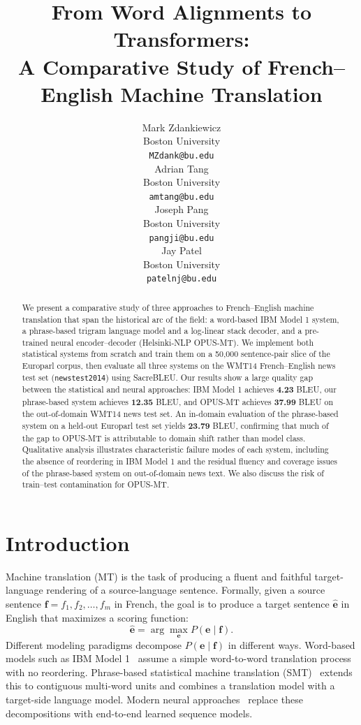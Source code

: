 \documentclass[11pt]{article}
\title{From Word Alignments to Transformers: \\
A Comparative Study of French--English Machine Translation}
\author{
  Mark Zdankiewicz \\
  Boston University \\
  \texttt{MZdank@bu.edu} \\\And
  Adrian Tang \\
  Boston University \\
  \texttt{amtang@bu.edu} \\\And
  Joseph Pang \\
  Boston University \\
  \texttt{pangji@bu.edu} \\\And
  Jay Patel \\
  Boston University \\
  \texttt{patelnj@bu.edu} \\\And
}
\begin{document}
\maketitle
 
\begin{abstract}
We present a comparative study of three approaches to French--English machine translation that span the historical arc of the field: a word-based IBM Model 1 system, a phrase-based trigram language model and a log-linear stack decoder, and a pre-trained neural encoder--decoder (Helsinki-NLP OPUS-MT). We implement both statistical systems from scratch and train them on a 50{,}000 sentence-pair slice of the Europarl corpus, then evaluate all three systems on the WMT14 French--English news test set (\texttt{newstest2014}) using SacreBLEU. Our results show a large quality gap between the statistical and neural approaches: IBM Model 1 achieves \textbf{4.23} BLEU, our phrase-based system achieves \textbf{12.35} BLEU, and OPUS-MT achieves \textbf{37.99} BLEU on the out-of-domain WMT14 news test set. An in-domain evaluation of the phrase-based system on a held-out Europarl test set yields \textbf{23.79} BLEU, confirming that much of the gap to OPUS-MT is attributable to domain shift rather than model class. Qualitative analysis illustrates characteristic failure modes of each system, including the absence of reordering in IBM Model 1 and the residual fluency and coverage issues of the phrase-based system on out-of-domain news text. We also discuss the risk of train--test contamination for OPUS-MT.
\end{abstract}
 
\section{Introduction}
\label{sec:intro}
 
Machine translation (MT) is the task of producing a fluent and faithful target-language rendering of a source-language sentence. Formally, given a source sentence $\mathbf{f} = f_1, f_2, \ldots, f_m$ in French, the goal is to produce a target sentence $\hat{\mathbf{e}}$ in English that maximizes a scoring function:
\begin{equation}
\hat{\mathbf{e}} = \arg\max_{\mathbf{e}} P(\mathbf{e} \mid \mathbf{f}).
\end{equation}
Different modeling paradigms decompose $P(\mathbf{e} \mid \mathbf{f})$ in different ways. Word-based models such as IBM Model 1~\cite{brown-etal-1993-mathematics} assume a simple word-to-word translation process with no reordering. Phrase-based statistical machine translation (SMT)~\cite{koehn-etal-2003-statistical} extends this to contiguous multi-word units and combines a translation model with a target-side language model. Modern neural approaches~\cite{vaswani-etal-2017-attention,tiedemann-thottingal-2020-opus} replace these decompositions with end-to-end learned sequence models.
 
\end{document}
